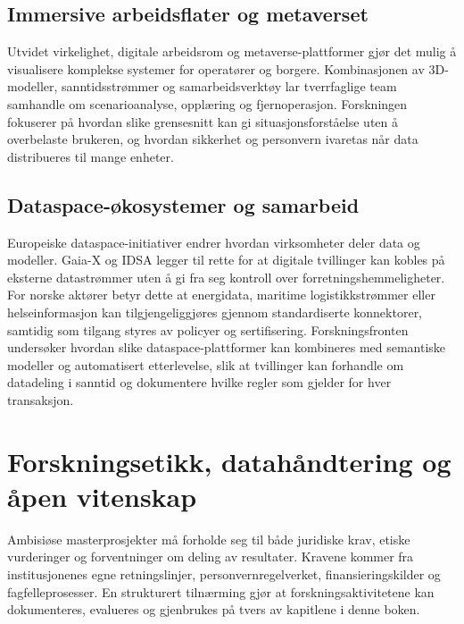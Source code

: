 \subsection{Immersive arbeidsflater og metaverset}
Utvidet virkelighet, digitale arbeidsrom og metaverse-plattformer gjør det mulig å visualisere komplekse systemer for operatører og borgere. Kombinasjonen av 3D-modeller, sanntidsstrømmer og samarbeidsverktøy lar tverrfaglige team samhandle om scenarioanalyse, opplæring og fjernoperasjon. Forskningen fokuserer på hvordan slike grensesnitt kan gi situasjonsforståelse uten å overbelaste brukeren, og hvordan sikkerhet og personvern ivaretas når data distribueres til mange enheter.

\subsection{Dataspace-økosystemer og samarbeid}
Europeiske dataspace-initiativer endrer hvordan virksomheter deler data og modeller. Gaia-X og IDSA legger til rette for at digitale tvillinger kan kobles på eksterne datastrømmer uten å gi fra seg kontroll over forretningshemmeligheter.\citep{gaiax2022architecture,idsa2023ram} For norske aktører betyr dette at energidata, maritime logistikkstrømmer eller helseinformasjon kan tilgjengeliggjøres gjennom standardiserte konnektorer, samtidig som tilgang styres av policyer og sertifisering. Forskningsfronten undersøker hvordan slike dataspace-plattformer kan kombineres med semantiske modeller og automatisert etterlevelse, slik at tvillinger kan forhandle om datadeling i sanntid og dokumentere hvilke regler som gjelder for hver transaksjon.

\section{Forskningsetikk, datahåndtering og åpen vitenskap}
Ambisiøse masterprosjekter må forholde seg til både juridiske krav, etiske vurderinger og forventninger om deling av resultater. Kravene kommer fra institusjonenes egne retningslinjer, personvernregelverket, finansieringskilder og fagfelleprosesser. En strukturert tilnærming gjør at forskningsaktivitetene kan dokumenteres, evalueres og gjenbrukes på tvers av kapitlene i denne boken.

